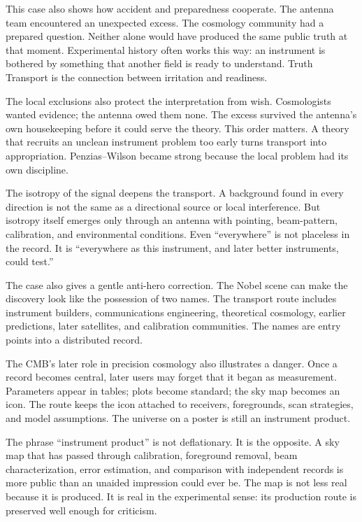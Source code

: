This case also shows how accident and preparedness cooperate. The antenna
team encountered an unexpected excess. The cosmology community had a
prepared question. Neither alone would have produced the same public
truth at that moment. Experimental history often works this way: an
instrument is bothered by something that another field is ready to
understand. Truth Transport is the connection between irritation and
readiness.

The local exclusions also protect the interpretation from wish.
Cosmologists wanted evidence; the antenna owed them none. The excess
survived the antenna's own housekeeping before it could serve the
theory. This order matters. A theory that recruits an unclean instrument
problem too early turns transport into appropriation. Penzias--Wilson
became strong because the local problem had its own discipline.

The isotropy of the signal deepens the transport. A background found in
every direction is not the same as a directional source or local
interference. But isotropy itself emerges only through an antenna with
pointing, beam-pattern, calibration, and environmental conditions. Even
``everywhere'' is not placeless in the record. It is ``everywhere as
this instrument, and later better instruments, could test.''

The case also gives a gentle anti-hero correction. The Nobel scene can
make the discovery look like the possession of two names. The transport
route includes instrument builders, communications engineering,
theoretical cosmology, earlier predictions, later satellites, and
calibration communities. The names are entry points into a distributed
record.

The CMB's later role in precision cosmology also illustrates a danger.
Once a record becomes central, later users may forget that it began as
measurement. Parameters appear in tables; plots become standard; the sky
map becomes an icon. The route keeps the icon attached to receivers,
foregrounds, scan strategies, and model assumptions. The universe on a
poster is still an instrument product.

The phrase ``instrument product'' is not deflationary. It is the
opposite. A sky map that has passed through calibration, foreground
removal, beam characterization, error estimation, and comparison with
independent records is more public than an unaided impression could ever
be. The map is not less real because it is produced. It is real in the
experimental sense: its production route is preserved well enough for
criticism.

